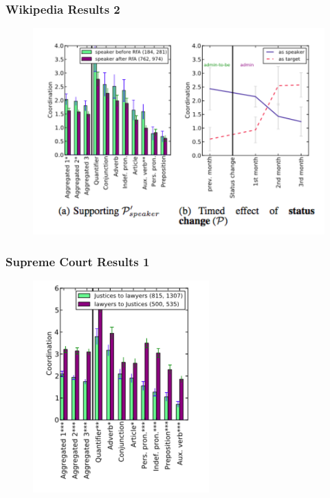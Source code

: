 \documentclass{beamer}
\begin{document}
\begin{frame}
\frametitle{Wikipedia Results 2}
\begin{figure}
\includegraphics[width=0.8\linewidth]{wikiresults3.png}
\end{figure}
\end{frame}
\begin{frame}
\frametitle{Supreme Court Results 1}
\begin{figure}
\includegraphics[width=0.5\linewidth]{supremeresults1.png}
\end{figure}
\end{frame}
\end{document}
